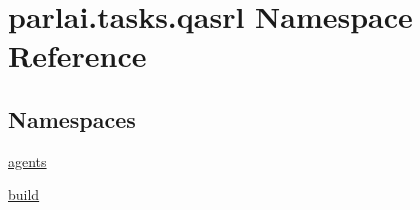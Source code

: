 \hypertarget{namespaceparlai_1_1tasks_1_1qasrl}{}\section{parlai.\+tasks.\+qasrl Namespace Reference}
\label{namespaceparlai_1_1tasks_1_1qasrl}
\subsection*{Namespaces}
\begin{DoxyCompactItemize}
\item 
 \hyperlink{namespaceparlai_1_1tasks_1_1qasrl_1_1agents}{agents}
\item 
 \hyperlink{namespaceparlai_1_1tasks_1_1qasrl_1_1build}{build}
\end{DoxyCompactItemize}
